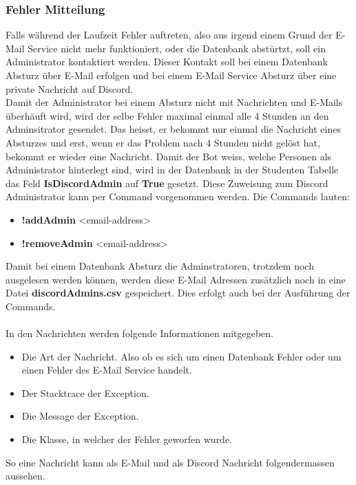 \documentclass[a4paper, table]{article}
\begin{document}
\subsubsection{Fehler Mitteilung}
Falls während der Laufzeit Fehler auftreten, also aus irgend einem Grund der E-Mail Service nicht mehr funktioniert, 
oder die Datenbank abstürtzt, soll ein Administrator kontaktiert werden.
Dieser Kontakt soll bei einem Datenbank Absturz über E-Mail erfolgen und bei einem E-Mail Service Absturz über eine private Nachricht auf Discord.\\
Damit der Administrator bei einem Absturz nicht mit Nachrichten und E-Mails überhäuft wird, 
wird der selbe Fehler maximal einmal alle 4 Stunden an den Adminsitrator gesendet.
Das heisst, er bekommt nur einmal die Nachricht eines Absturzes und erst, wenn er das Problem nach 4 Stunden nicht gelöst hat, 
bekommt er wieder eine Nachricht.
\newpage
Damit der Bot weiss, welche Personen als Administrator hinterlegt sind, 
wird in der Datenbank in der Studenten Tabelle das Feld \textbf{IsDiscordAdmin} auf \textbf{True} gesetzt.
Diese Zuweisung zum Discord Administrator kann per Command vorgenommen werden.
Die Commands lauten:
\begin{itemize}
    \item \textbf{!addAdmin} <email-address>
    \item \textbf{!removeAdmin} <email-address>
\end{itemize}
Damit bei einem Datenbank Absturz die Adminstratoren, trotzdem noch ausgelesen werden können, 
werden diese E-Mail Adressen zusätzlich noch in eine Datei \textbf{discordAdmins.csv} gespeichert.
Dies erfolgt auch bei der Ausführung der Commands.\\\\
In den Nachrichten werden folgende Informationen mitgegeben.
\begin{itemize}
    \item Die Art der Nachricht. Also ob es sich um einen Datenbank Fehler oder um einen Fehler des E-Mail Service handelt.
    \item Der Stacktrace der Exception.
    \item Die Message der Exception.
    \item Die Klasse, in welcher der Fehler geworfen wurde.
\end{itemize}
So eine Nachricht kann als E-Mail und als Discord Nachricht folgendermassen aussehen.
\end{document}
